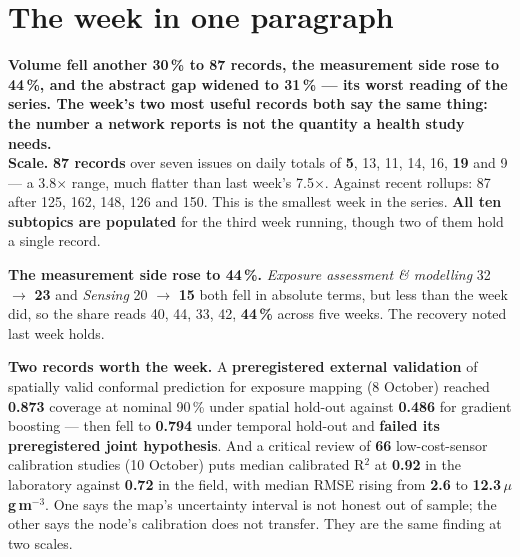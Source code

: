 \documentclass[10pt]{article}
\begin{document}
\vspace{6mm}

\section*{\sffamily\bfseries\color{Deep}The week in one paragraph}
\vspace{-1.5mm}{\color{Teal}\rule{\linewidth}{1.1pt}}\vspace{2.5mm}

\begin{keybox}
{\sffamily\bfseries\small\color{Deep}Volume fell another 30\,\% to 87 records, the measurement side rose
to 44\,\%, and the abstract gap widened to 31\,\% --- its worst reading of the series. The week's two
most useful records both say the same thing: the number a network reports is not the quantity a health
study needs.}\\[1.4mm]
\footnotesize
\textbf{Scale.} \textbf{87 records} over seven issues on daily totals of \textbf{5}, 13, 11, 14, 16,
\textbf{19} and 9 --- a 3.8$\times$ range, much flatter than last week's 7.5$\times$. Against recent
rollups: 87 after 125, 162, 148, 126 and 150. This is the smallest week in the series. \textbf{All ten
subtopics are populated} for the third week running, though two of them hold a single record.

\textbf{The measurement side rose to 44\,\%.} \textit{Exposure assessment \& modelling} 32
$\rightarrow$ \textbf{23} and \textit{Sensing} 20 $\rightarrow$ \textbf{15} both fell in absolute terms,
but less than the week did, so the share reads 40, 44, 33, 42, \textbf{44\,\%} across five weeks. The
recovery noted last week holds.

\textbf{Two records worth the week.} A \textbf{preregistered external validation} of spatially valid
conformal prediction for exposure mapping (8 October) reached \textbf{0.873} coverage at nominal 90\,\%
under spatial hold-out against \textbf{0.486} for gradient boosting --- then fell to \textbf{0.794} under
temporal hold-out and \textbf{failed its preregistered joint hypothesis}. And a critical review of
\textbf{66} low-cost-sensor calibration studies (10 October) puts median calibrated R$^2$ at
\textbf{0.92} in the laboratory against \textbf{0.72} in the field, with median RMSE rising from
\textbf{2.6} to \textbf{12.3\,$\mu$g\,m$^{-3}$}. One says the map's uncertainty interval is not honest
out of sample; the other says the node's calibration does not transfer. They are the same finding at two
scales.


\end{keybox}
\end{document}
